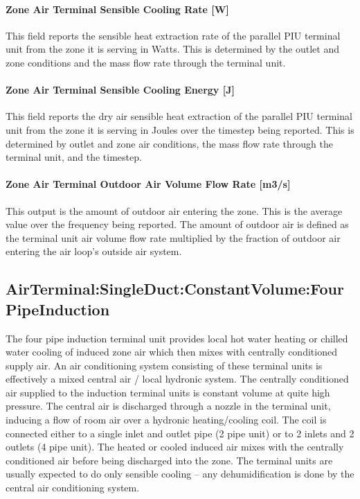 \paragraph{Zone Air Terminal Sensible Cooling Rate {[}W{]}}\label{zone-air-terminal-sensible-cooling-rate-w-2}

This field reports the sensible heat extraction rate of the parallel PIU terminal unit from the zone it is serving in Watts. This is determined by the outlet and zone conditions and the mass flow rate through the terminal unit.

\paragraph{Zone Air Terminal Sensible Cooling Energy {[}J{]}}\label{zone-air-terminal-sensible-cooling-energy-j-2}

This field reports the dry air sensible heat extraction of the parallel PIU terminal unit from the zone it is serving in Joules over the timestep being reported. This is determined by outlet and zone air conditions, the mass flow rate through the terminal unit, and the timestep.

\paragraph{Zone Air Terminal Outdoor Air Volume Flow Rate {[}m3/s{]}}

This output is the amount of outdoor air entering the zone. This is the average value over the frequency being reported. The amount of outdoor air is defined as the terminal unit air volume flow rate multiplied by the fraction of outdoor air entering the air loop's outside air system.

\subsection{AirTerminal:SingleDuct:ConstantVolume:FourPipeInduction}\label{airterminalsingleductconstantvolumefourpipeinduction}

The four pipe induction terminal unit provides local hot water heating or chilled water cooling of induced zone air which then mixes with centrally conditioned supply air. An air conditioning system consisting of these terminal units is effectively a mixed central air / local hydronic system. The centrally conditioned air supplied to the induction terminal units is constant volume at quite high pressure. The central air is discharged through a nozzle in the terminal unit, inducing a flow of room air over a hydronic heating/cooling coil. The coil is connected either to a single inlet and outlet pipe (2 pipe unit) or to 2 inlets and 2 outlets (4 pipe unit). The heated or cooled induced air mixes with the centrally conditioned air before being discharged into the zone. The terminal units are usually expected to do only sensible cooling -- any dehumidification is done by the central air conditioning system.

